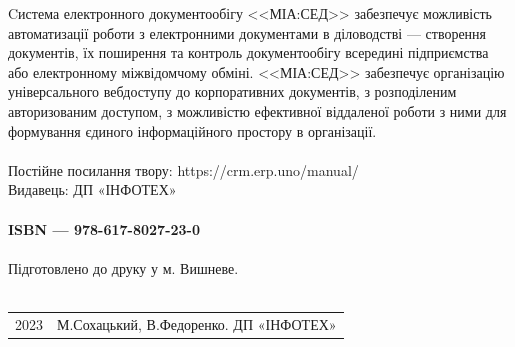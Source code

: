 Cистема електронного документообігу <<МІА:СЕД>> забезпечує можливість автоматизації роботи з електронними
документами в діловодстві --- створення документів, їх поширення та контроль
документообігу всередині підприємства або електронному міжвідомчому обміні.
<<МІА:СЕД>> забезпечує організацію універсального вебдоступу до корпоративних
документів, з розподіленим авторизованим доступом, з можливістю ефективної
віддаленої роботи з ними для формування єдиного інформаційного простору в
організації.
\\
\\
Постійне посилання твору: https://crm.erp.uno/manual/ \\
Видавець: ДП «ІНФОТЕХ»
\\
\\
{\bf ISBN --- 978-617-8027-23-0 \hspace{2em}}
\\
\\
Підготовлено до друку у м. Вишневе.
\\
\\
\begin{tabular}{ll}
\textcopyright{} 2023 & М.Сохацький, В.Федоренко. ДП «ІНФОТЕХ»
\end{tabular}

\newpage
\cleartorecto
\tableofcontents*
\mainmatter

